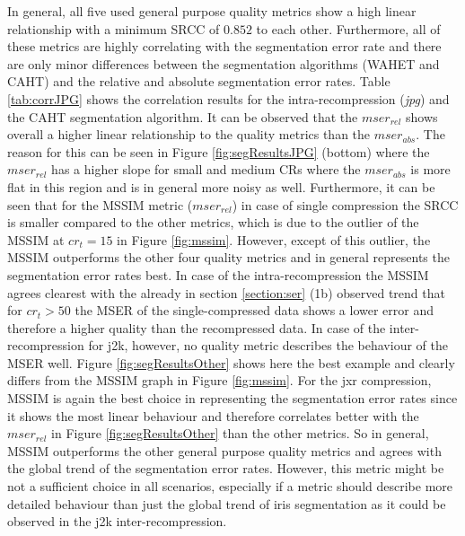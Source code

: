\documentclass[10pt,twocolumn,letterpaper]{article}
\begin{document}
In general, all five used general purpose quality metrics show a high linear relationship with a minimum SRCC of $0.852$ to each other. Furthermore, all of these metrics are highly correlating with the segmentation error rate and there are only minor differences between the segmentation algorithms (WAHET and CAHT) and the relative and absolute segmentation error rates. Table \ref{tab:corrJPG} shows the correlation results for the intra-recompression (\emph{jpg}) and the CAHT segmentation algorithm. It can be observed that the $mser_{rel}$ shows overall a higher linear relationship to the quality metrics than the $mser_{abs}$. The reason for this can be seen in Figure \ref{fig:segResultsJPG} (bottom) where the $mser_{rel}$ has a higher slope for small and medium CRs where the $mser_{abs}$ is more flat in this region and is in general more noisy as well.
Furthermore, it can be seen that for the MSSIM metric ($mser_{rel}$) in case of single compression the SRCC is smaller compared to the other metrics, which is due to the outlier of the MSSIM at $cr_t = 15$ in Figure \ref{fig:mssim}. However, except of this outlier, the MSSIM outperforms the other four quality metrics and in general represents the segmentation error rates best. In case of the intra-recompression the MSSIM agrees clearest with the already in section \ref{section:ser} (1b) observed trend that for $cr_t > 50$ the MSER of the single-compressed data shows a lower error and therefore a higher quality than the recompressed data. In case of the inter-recompression for j2k, however, no quality metric describes the behaviour of the MSER well. Figure \ref{fig:segResultsOther} shows here the best example and clearly differs from the MSSIM graph in Figure \ref{fig:mssim}. For the jxr compression, MSSIM is again the best choice in representing the segmentation error rates since it shows the most linear behaviour and therefore correlates better with the $mser_{rel}$ in Figure \ref{fig:segResultsOther} than the other metrics.
So in general, MSSIM outperforms the other general purpose quality metrics and agrees with the global trend of the segmentation error rates. However, this metric might be not a sufficient choice in all scenarios, especially if a metric should describe more detailed behaviour than just the global trend of iris segmentation as it could be observed in the j2k inter-recompression.
\end{document}
